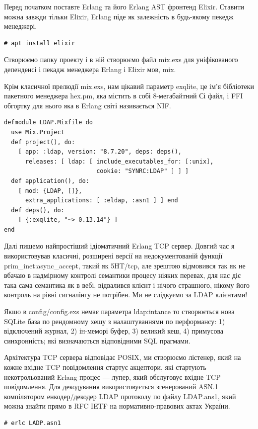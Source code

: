 Перед початком поставте Erlang та його Erlang AST фронтенд Elixir. Ставити можна завжди тільки Elixir, Erlang піде як залежність в будь-якому пекедж менеджері.

\begin{lstlisting}
# apt install elixir
\end{lstlisting}

Створюємо папку проекту і в ній створюємо файл mix.exs для уніфікованого депенденсі і пекадж менеджера Erlang і Elixir мов, mix.

Крім класичної прелюдії mix.exs, нам цікавий параметр exqlite, це ім'я бібліотеки пакетного менеджера hex.pm, яка містить в собі 8-мегабайтний Сі файл, і FFI обгортку для нього яка в Erlang світі називається NIF.

\begin{lstlisting}
defmodule LDAP.Mixfile do
  use Mix.Project
  def project(), do:
    [ app: :ldap, version: "8.7.20", deps: deps(),
      releases: [ ldap: [ include_executables_for: [:unix],
                          cookie: "SYNRC:LDAP" ] ] ]
  def application(), do:
    [ mod: {LDAP, []},
      extra_applications: [ :eldap, :asn1 ] ] end
  def deps(), do:
    [ {:exqlite, "~> 0.13.14"} ]
end
\end{lstlisting}

Далі пишемо найпростіший ідіоматичний Erlang TCP сервер. Довгий час я використовував класичні, розширені версії на недокументованій функції prim_inet:async_accept, такий як 5HT/tcp, але зрештою відмовився так як не вбачаю в надмірному контролі семантики процесу ніяких перевах, для нас діє така сама семантика як в вебі, відвалився клієнт і нічого страшного, нікому його контроль на рівні сигналінгу не потрібен. Ми не слідкуємо за LDAP клієнтами!

Якшо в config/config.exs немає параметра ldap:intance то створюється нова SQLite база по рендомному хешу з налаштуваннями по перформансу: 1) відключений журнал, 2) ін-меморі буфер, 3) великий кеш, 4) примусова синхронність; які визначаються відповідними SQL прагмами.

Архітектура TCP сервера відповідає POSIX, ми створюємо лістенер, який на кожне вхідне TCP повідомлення стартує акцептори, які стартують некотрольований Erlang процес — лупер, який обслуговує вхідне TCP повідомлення. Для декодування використовується згенерований ASN.1 компілятором енкодер/декодер LDAP протоколу по файлу LDAP.ans1, який можна знайти прямо в RFC IETF на нормативно-правових актах України.

\begin{lstlisting}
# erlc LADP.asn1
\end{lstlisting}

